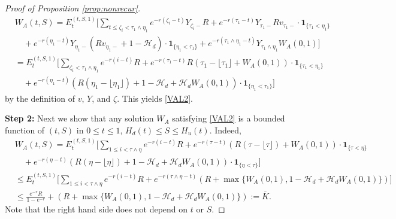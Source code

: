 \documentclass[final,pdftex]{ectaart}
\theoremstyle{plain}
\begin{document}
\begin{appendices}
\begin{proof}[Proof of Proposition \ref{prop:nonrecur}]
	\begin{align*}
	&W_A(t,S)=E_t^{(t,S,1)}\Bigg[\sum_{t\le\zeta_i<\tau_1\land\eta_1}e^{-r(\zeta_i-t)}Y_{\zeta_i-}R+e^{-r(\tau_1-t)}Y_{\tau_1-}Rv_{\tau_1-}\cdot\mathbf{1}_{\{\tau_1<\eta_1\}}\\
	&\quad+e^{-r(\eta_1-t)}Y_{\eta_1-}(Rv_{\eta_1-}+1-\mathcal{H}_d)\cdot\mathbf{1}_{\{\eta_1<\tau_1\}}+e^{-r(\tau_1\land\eta_1-t)}Y_{\tau_1\land\eta_1}W_A(0,1)\Bigg]\\
	&=E_t^{(t,S,1)}\Bigg[\sum_{\zeta_i<\tau_1\land\eta_1}e^{-r(i-t)}R+e^{-r(\tau_1-t)}R(\tau_1-\lfloor\tau_1\rfloor+W_A(0,1))\cdot\mathbf{1}_{\{\tau_1<\eta_1\}}\\
	&\quad+e^{-r(\eta_1-t)}(R(\eta_1-\lfloor\eta_1\rfloor)+1-\mathcal{H}_d+\mathcal{H}_d W_A(0,1))\cdot\mathbf{1}_{\{\eta_1<\tau_1\}}\Bigg]
	\end{align*}
	by the definition of $v$, $Y$, and $\zeta$. This yields \eqref{VAL2}.
	
	{\flushleft\bf Step 2:} Next we show that any solution $W_A$ satisfying \eqref{VAL2} is a bounded function of $(t,S)$ in $0\le t\le 1$, $H_d(t)\le S\le H_u(t)$. Indeed,
	\begin{align*}
	&W_A(t,S)=E_t^{(t,S,1)}\Bigg[\sum_{1\le i< \tau\land\eta}e^{-r(i-t)}R+e^{-r(\tau-t)}(R(\tau-\lfloor\tau\rfloor)+W_A(0,1))\cdot\mathbf{1}_{\{\tau<\eta\}}\\
	&\quad+e^{-r(\eta-t)}(R(\eta-\lfloor\eta\rfloor)+1-\mathcal{H}_d+\mathcal{H}_d W_A(0,1))\cdot \mathbf{1}_{\{\eta<\tau\}}\Bigg]\\
	&\le E_t^{(t,S,1)}\Bigg[\sum_{1\le i< \tau\land\eta}e^{-r(i-t)}R+e^{-r(\tau\land\eta-t)}(R+\max\{W_A(0,1),1-\mathcal{H}_d+\mathcal{H}_d W_A(0,1)\})\Bigg]\\
	&\le \frac{e^{-r}R}{1-e^{-r}}+(R+\max\{W_A(0,1),1-\mathcal{H}_d+\mathcal{H}_d W_A(0,1)\}):=\overline{K}.
	\end{align*}
	Note that the right hand side does not depend on $t$ or $S$.
	

\end{proof}
\end{appendices}
\end{document}
